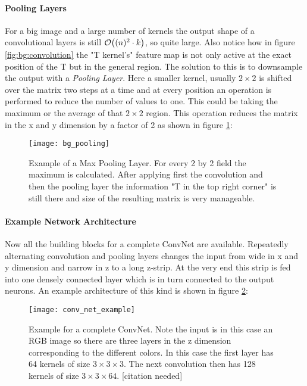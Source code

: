 \paragraph{Pooling Layers}
For a big image and a large number of kernels the output shape of a convolutional layers is still $\order{(n)^2 \cdot k}$, so quite large. Also notice how in figure \ref{fig:bg:convolution} the "T kernel's" feature map is not only active at the exact position of the T but in the general region. The solution to this is to downsample the output with a \textit{Pooling Layer}. Here a smaller kernel, usually $2 \times 2$ is shifted over the matrix two steps at a time and at every position an operation is performed to reduce the number of values to one. This could be taking the maximum or the average of that $2 \times 2$ region. This operation reduces the matrix in the x and y dimension by a factor of 2 as shown in figure \ref{fig:bg:pooling}:

\begin{figure}[H]
    \centering
    \texttt{[image: bg\_pooling]}
    \caption{Example of a Max Pooling Layer. For every 2 by 2 field the maximum is calculated. After applying first the convolution and then the pooling layer the information "T in the top right corner" is still there and size of the resulting matrix is very manageable.}
    \label{fig:bg:pooling}
\end{figure}

\paragraph{Example Network Architecture}
Now all the building blocks for a complete ConvNet are available. Repeatedly alternating convolution and pooling layers changes the input from wide in x and y dimension and narrow in z to a long z-strip. At the very end this strip is fed into one densely connected layer which is in turn connected to the output neurons. An example architecture of this kind is shown in figure \ref{fig:bg:NN_example}:

\begin{figure}[H]
    \centering
    \texttt{[image: conv\_net\_example]}
    \caption{Example for a complete ConvNet. Note the input is in this case an RGB image so there are three layers in the z dimension corresponding to the different colors. In this case the first layer has 64 kernels of size $3 \times 3 \times 3$. The next convolution then has 128 kernels of size $3 \times 3 \times 64$. [citation needed]}
    \label{fig:bg:NN_example}
\end{figure}



